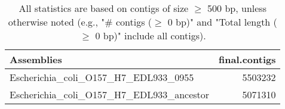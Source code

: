 \documentclass[12pt,a4paper]{article}
\begin{document}
\begin{table}[ht]
\begin{center}
\caption{All statistics are based on contigs of size $\geq$ 500 bp, unless otherwise noted (e.g., "\# contigs ($\geq$ 0 bp)" and "Total length ($\geq$ 0 bp)" include all contigs).}
\begin{tabular}{|l*{1}{|r}|}
\hline
Assemblies & final.contigs \\ \hline
Escherichia\_coli\_O157\_H7\_EDL933\_0955 & 5503232 \\ \hline
Escherichia\_coli\_O157\_H7\_EDL933\_ancestor & 5071310 \\ \hline
\end{tabular}
\end{center}
\end{table}
\end{document}
